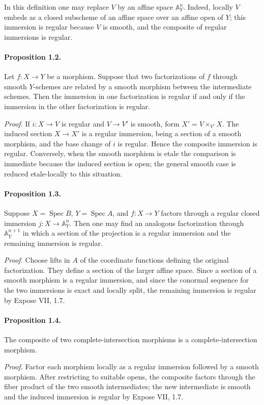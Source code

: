 \documentclass[11pt]{article}
\theoremstyle{plain}
\theoremstyle{definition}
\theoremstyle{remark}
\newcommand{\bbA}{\mathbb A}
\DeclareMathOperator{\Spec}{Spec}
\begin{document}
In this definition one may replace $V$ by an affine space $\bbA^n_Y$. Indeed, locally $V$ embeds as a closed subscheme of an affine space over an affine open of $Y$; this immersion is regular because $V$ is smooth, and the composite of regular immersions is regular.

\paragraph{Proposition 1.2.} Let $f:X\to Y$ be a morphism. Suppose that two factorizations of $f$ through smooth $Y$-schemes are related by a smooth morphism between the intermediate schemes. Then the immersion in one factorization is regular if and only if the immersion in the other factorization is regular.

\emph{Proof.} If $i:X\to V$ is regular and $V\to V'$ is smooth, form $X'=V\times_{V'}X$. The induced section $X\to X'$ is a regular immersion, being a section of a smooth morphism, and the base change of $i$ is regular. Hence the composite immersion is regular. Conversely, when the smooth morphism is etale the comparison is immediate because the induced section is open; the general smooth case is reduced etale-locally to this situation.

\paragraph{Proposition 1.3.} Suppose $X=\Spec B$, $Y=\Spec A$, and $f:X\to Y$ factors through a regular closed immersion $j:X\to\bbA^n_Y$. Then one may find an analogous factorization through $\bbA^{n+1}_Y$ in which a section of the projection is a regular immersion and the remaining immersion is regular.

\emph{Proof.} Choose lifts in $A$ of the coordinate functions defining the original factorization. They define a section of the larger affine space. Since a section of a smooth morphism is a regular immersion, and since the conormal sequence for the two immersions is exact and locally split, the remaining immersion is regular by Expose VII, 1.7.

\paragraph{Proposition 1.4.} The composite of two complete-intersection morphisms is a complete-intersection morphism.

\emph{Proof.} Factor each morphism locally as a regular immersion followed by a smooth morphism. After restricting to suitable opens, the composite factors through the fiber product of the two smooth intermediates; the new intermediate is smooth and the induced immersion is regular by Expose VII, 1.7.
\end{document}
